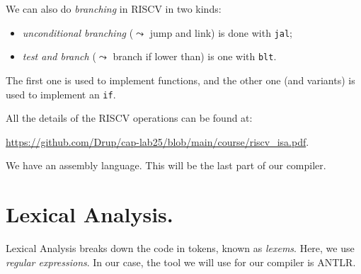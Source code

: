 \documentclass[./main]{subfiles}
\begin{document}
  We can also do \textit{branching} in RISCV in two kinds:
  \begin{itemize}
    \item \textit{unconditional branching} ($\leadsto$ jump and link) is done with \texttt{jal};
    \item \textit{test and branch} ($\leadsto$ branch if lower than) is one with \texttt{blt}.
  \end{itemize}
  The first one is used to implement functions, and the other one (and variants) is used to implement an \texttt{if}.

  All the details of the RISCV operations can be found at:
  \begin{center}
    \footnotesize\url{https://github.com/Drup/cap-lab25/blob/main/course/riscv_isa.pdf}.
  \end{center}

  We have an assembly language. This will be the last part of our compiler.

  \section{Lexical Analysis.}
  
  Lexical Analysis breaks down the code in tokens, known as \textit{lexems}.
  Here, we use \textit{regular expressions}.
  In our case, the tool we will use for our compiler is ANTLR.
\end{document}
